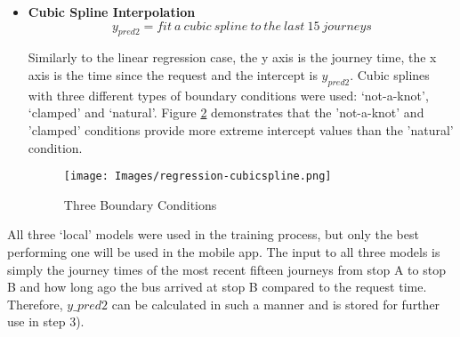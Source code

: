 \begin{itemize}
    If the y axis is the journey time and the x axis is the time since the request, then $y_{pred2}$ is the intercept with the y axis. It is undesirable to use a regression model with degree larger than 1 because at the extremes the values become very large or very small. Thus, the intercept, would also be very large or very small and not close enough to the desired predicted value. This is demonstrated in Figure \ref{fig:extreme-bestfit}, which shows the journey times of the last 15 journeys alongside the regression models. It could be inferred from the last 15 journey times that the bus journey time at the request time (i.e. at 0 on the x axis) would be somewhere in between 5 and 7 minutes. This is captured best with the model with degree = 1.
    
    \begin{figure}[H]
    \begin{center}
        \texttt{[image: Images/regression-lineofbestfit.png]}
        \caption{Intercept becomes more extreme}
        \label{fig:extreme-bestfit}
    \end{center}
    \end{figure}
    
    \item \textbf{Cubic Spline Interpolation}
    \begin{equation}
        y_{pred2} = fit\ a\ cubic\ spline\ to\ the\ last\ 15\ journeys
    \end{equation}
    
    Similarly to the linear regression case, the y axis is the journey time, the x axis is the time since the request and the intercept is $y_{pred2}$. Cubic splines with three different types of boundary conditions were used: `not-a-knot', `clamped' and `natural'. Figure \ref{fig:extreme-bestfit} demonstrates that the 'not-a-knot' and 'clamped' conditions provide more extreme intercept values than the 'natural' condition.
    
    \begin{figure}[H]
    \begin{center}
        \texttt{[image: Images/regression-cubicspline.png]}
        \caption{Three Boundary Conditions}
        \label{fig:extreme-bestfit}
    \end{center}
    \end{figure}

\end{itemize}

All three `local' models were used in the training process, but only the best performing one will be used in the mobile app. The input to all three models is simply the journey times of the most recent fifteen journeys from stop A to stop B and how long ago the bus arrived at stop B compared to the request time. Therefore, $y\_{pred2}$ can be calculated in such a manner and is stored for further use in step 3).\\

